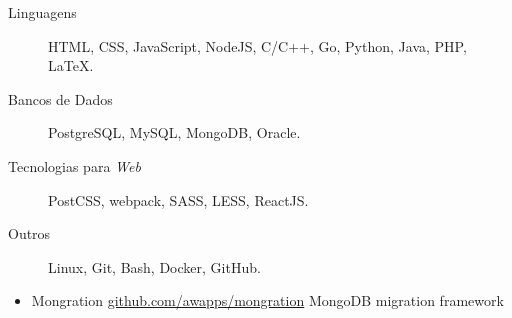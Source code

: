 \documentclass[letterpaper,11pt]{article}
\begin{document}
    \begin{description}
        \item[Linguagens]
            HTML, CSS, JavaScript, NodeJS, C/C++, Go, Python, Java, PHP, \LaTeX.
        \item[Bancos de Dados]
            PostgreSQL, MySQL, MongoDB, Oracle.
        \item[Tecnologias para \textit{Web}]
            PostCSS, webpack, SASS, LESS, ReactJS.
        \item[Outros]
            Linux, Git, Bash, Docker, GitHub.
    \end{description}

    \begin{itemize}
        \item
            \ressubheading
                {Mongration}
                {\href{https://github.com/awapps/mongration}{github.com/awapps/mongration}}
                {MongoDB migration framework}
                {}
    \end{itemize}
\end{document}

